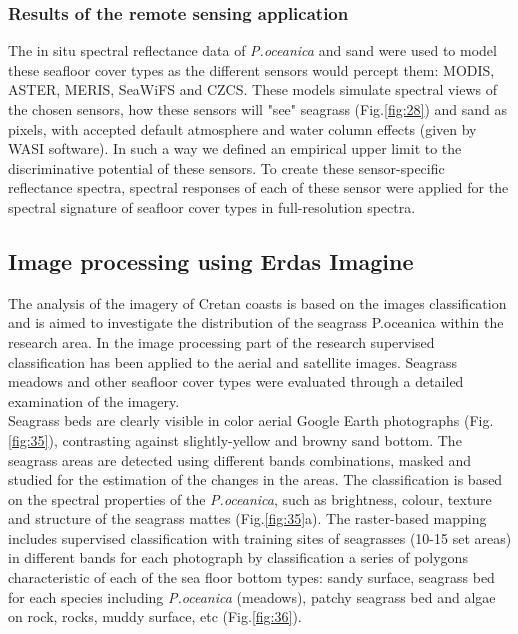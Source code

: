 \documentclass[10pt, a4paper]{article}
\begin{document}
\subsubsection{Results of the remote sensing application}
The in situ spectral reflectance data of \textit{P.oceanica} and sand were used to model these seafloor cover
types as the different sensors would percept them: MODIS, ASTER, MERIS, SeaWiFS and CZCS.
These models simulate spectral views of the chosen sensors, how these sensors will "see" seagrass (Fig.\ref{fig:28}) and sand as
pixels, with accepted default atmosphere and water column effects (given by WASI software). In such
a way we defined an empirical upper limit to the discriminative potential of these sensors. To create
these sensor-specific reflectance spectra, spectral responses of each of these sensor were applied for
the spectral signature of seafloor cover types in full-resolution spectra.

\subsection{Image processing using Erdas Imagine}
The analysis of the imagery of Cretan coasts is based on the images classification and is aimed to
investigate the distribution of the seagrass P.oceanica within the research area.
In the image processing part of the research supervised classification has been applied to the aerial
and satellite images. Seagrass meadows and other seafloor cover types were evaluated through a
detailed examination of the imagery. \\
Seagrass beds are clearly visible in color aerial Google Earth
photographs (Fig.\ref{fig:35}), contrasting against slightly-yellow and browny sand bottom. The seagrass areas are
detected using different bands combinations, masked and studied for the estimation of the changes in
the areas. The classification is based on the spectral properties of the \textit{P.oceanica}, such as brightness,
colour, texture and structure of the seagrass mattes (Fig.\ref{fig:35}a). The raster-based mapping
includes supervised classification with training sites of seagrasses (10-15 set areas) in different bands
for each photograph by classification a series of polygons characteristic of each of the sea floor
bottom types: sandy surface, seagrass bed for each species including \textit{P.oceanica} (meadows), patchy
seagrass bed and algae on rock, rocks, muddy surface, etc (Fig.\ref{fig:36}).
\end{document}
